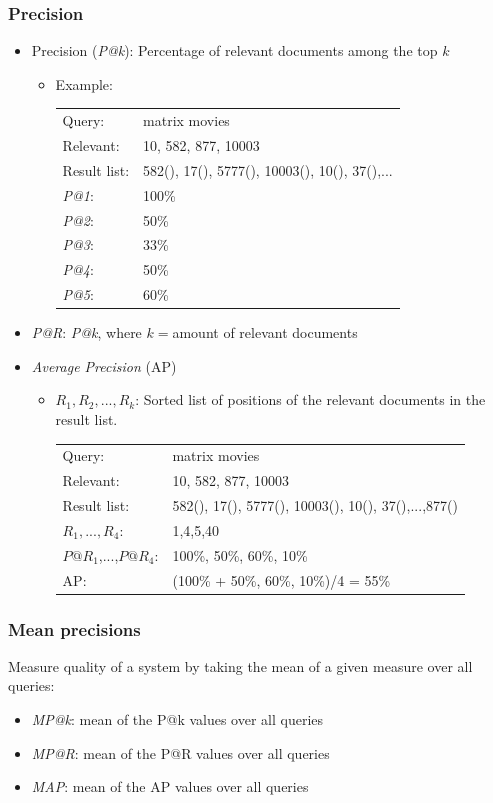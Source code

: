 \documentclass[a4paper]{scrartcl}
\newcommand{\cmark}{\ding{51}}%
\newcommand{\xmark}{\ding{55}}%
\begin{document}
\subsubsection{Precision}
\begin{itemize}
\item Precision (\emph{P@k}): Percentage of relevant documents among the top $k$
  \begin{itemize}
  \item Example:\\
    \begin{tabular}{ll}
      Query:& matrix movies \\
      Relevant:& 10, 582, 877, 10003 \\
      Result list:& 582(\cmark), 17(\xmark), 5777(\xmark), 10003(\cmark), 10(\cmark), 37(\xmark),...\\
      \emph{P@1}:&100\% \\
      \emph{P@2}:&50\% \\
      \emph{P@3}:&33\% \\
      \emph{P@4}:&50\% \\
      \emph{P@5}:&60\% \\
    \end{tabular}
  \end{itemize}
\item \emph{P@R}: \emph{P@k}, where $k=$amount of relevant documents
\item \emph{Average Precision} (AP)
  \begin{itemize}
  \item $R_1,R_2,...,R_k$: Sorted list of positions of the relevant documents in
    the result list. \\
    \begin{tabular}{ll}
      Query:& matrix movies \\
      Relevant:& 10, 582, 877, 10003 \\
      Result list:& 582(\cmark), 17(\xmark), 5777(\xmark), 10003(\cmark), 10(\cmark), 37(\xmark),...,877(\cmark) \\
      $R_1,...,R_4$:& 1,4,5,40 \\
      $P@R_1$,...,$P@R_4$:& 100\%, 50\%, 60\%, 10\% \\
      AP:& (100\% + 50\%, 60\%, 10\%)/4 = 55\%
    \end{tabular}
  \end{itemize}
\end{itemize}

\subsubsection{Mean precisions}
Measure quality of a system by taking the mean of a given measure over all
queries:
\begin{itemize}
\item \emph{MP@k}: mean of the P@k values over all queries
\item \emph{MP@R}: mean of the P@R values over all queries
\item \emph{MAP}: mean of the AP values over all queries
\end{itemize}
\end{document}
